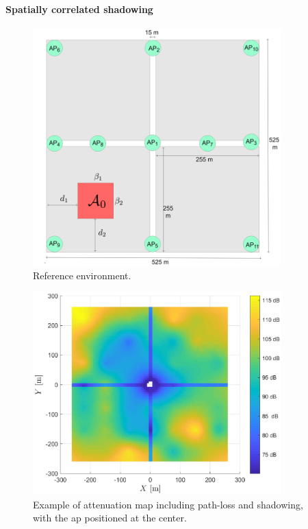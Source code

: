 \documentclass[final,twocolumn]{IEEEtran}
\begin{document}
\paragraph*{Spatially correlated shadowing} 

\begin{figure}[t]
    \centering
    \includegraphics[width=9.6cm]{scenariotex.png}
    \caption{Reference environment.} 
    \label{fig:mBS}
\end{figure}

\begin{figure}[t]
    \centering
    \includegraphics[width=9.6cm]{map.eps}
    \caption{Example of attenuation map including path-loss and shadowing, with the \ac{ap} positioned at the center.}
    \label{fig:map}
\end{figure}
\end{document}
